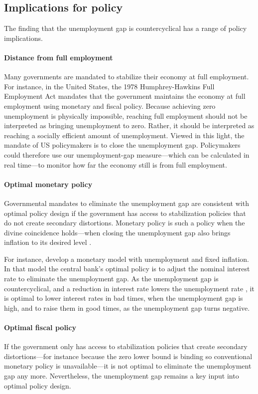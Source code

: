 \documentclass[letterpaper,12pt,leqno]{article}
\begin{document}
\subsection{Implications for policy}

The finding that the unemployment gap is countercyclical has a range of policy implications.

\paragraph{Distance from full employment}  Many governments are mandated to stabilize their economy at full employment. For instance, in the United States, the 1978 Humphrey-Hawkins Full Employment Act mandates that the government maintains the economy at full employment using monetary and fiscal policy. Because achieving zero unemployment is physically impossible, reaching full employment should not be interpreted as bringing unemployment to zero. Rather, it should be interpreted as reaching a socially efficient amount of unemployment. Viewed in this light, the mandate of US policymakers is to close the unemployment gap. Policymakers could therefore use our unemployment-gap measure---which can be calculated in real time---to monitor how far the economy still is from full employment. 

\paragraph{Optimal monetary policy} Governmental mandates to eliminate the unemployment gap are consistent with optimal policy design if the government has access to stabilization policies that do not create secondary distortions. Monetary policy is such a policy when the divine coincidence holds---when closing the unemployment gap also brings inflation to its desired level . 

For instance,  develop a monetary model with unemployment and fixed inflation. In that model the central bank's optimal policy is to adjust the nominal interest rate to eliminate the unemployment gap. As the unemployment gap is countercyclical, and a reduction in interest rate lowers the unemployment rate , it is optimal to lower interest rates in bad times, when the unemployment gap is high, and to raise them in good times, as the unemployment gap turns negative.

\paragraph{Optimal fiscal policy} If the government only has access to stabilization policies that create secondary distortions---for instance because the zero lower bound is binding so conventional monetary policy is unavailable---it is not optimal to eliminate the unemployment gap any more. Nevertheless, the unemployment gap remains a key input into optimal policy design.
\end{document}
